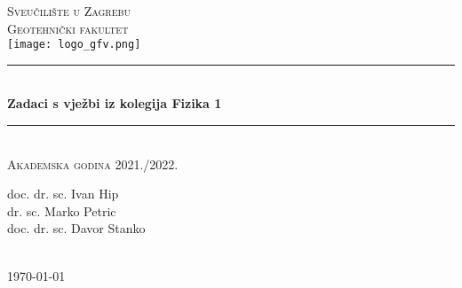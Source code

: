 \documentclass[10pt]{book}
\begin{document}
\begin{titlepage}

\newcommand{\HRule}{\rule{\linewidth}{0.5mm}} %

\center %

\textsc{\Large Sveučilište u Zagrebu\\ Geotehnički fakultet}\\[1.0cm] %

\texttt{[image: logo\_gfv.png]}\\[2.0cm] %


\HRule \\[0.4cm]
{ \huge \bfseries Zadaci s vježbi iz kolegija Fizika 1}\\[0.4cm] %
\HRule \\[1.5cm]

\textsc{\large Akademska godina 2021./2022.}\\[0.5cm] %

\justify
 
\begin{center}
\begin{minipage}{0.8\textwidth}
\begin{justify} 
\vspace{1.2cm}
\begin{center}
doc. dr. sc. Ivan Hip\\
dr. sc. Marko Petric\\
doc. dr. sc. Davor Stanko
                     
\end{center}

\end{justify}
\end{minipage}\\[3cm]
\today
\end{center}


\end{titlepage}

\end{document}
